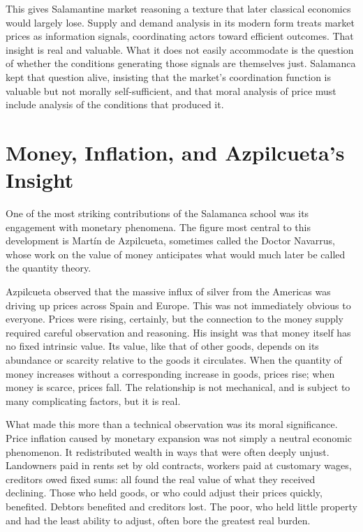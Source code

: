 \documentclass[11pt,a4paper,oneside]{book}
\begin{document}
This gives Salamantine market reasoning a texture that later classical economics would largely lose. Supply and demand analysis in its modern form treats market prices as information signals, coordinating actors toward efficient outcomes. That insight is real and valuable. What it does not easily accommodate is the question of whether the conditions generating those signals are themselves just. Salamanca kept that question alive, insisting that the market's coordination function is valuable but not morally self-sufficient, and that moral analysis of price must include analysis of the conditions that produced it.

\section*{Money, Inflation, and Azpilcueta's Insight}

One of the most striking contributions of the Salamanca school was its engagement with monetary phenomena. The figure most central to this development is Martín de Azpilcueta, sometimes called the Doctor Navarrus, whose work on the value of money anticipates what would much later be called the quantity theory.

Azpilcueta observed that the massive influx of silver from the Americas was driving up prices across Spain and Europe. This was not immediately obvious to everyone. Prices were rising, certainly, but the connection to the money supply required careful observation and reasoning. His insight was that money itself has no fixed intrinsic value. Its value, like that of other goods, depends on its abundance or scarcity relative to the goods it circulates. When the quantity of money increases without a corresponding increase in goods, prices rise; when money is scarce, prices fall. The relationship is not mechanical, and is subject to many complicating factors, but it is real.

What made this more than a technical observation was its moral significance. Price inflation caused by monetary expansion was not simply a neutral economic phenomenon. It redistributed wealth in ways that were often deeply unjust. Landowners paid in rents set by old contracts, workers paid at customary wages, creditors owed fixed sums: all found the real value of what they received declining. Those who held goods, or who could adjust their prices quickly, benefited. Debtors benefited and creditors lost. The poor, who held little property and had the least ability to adjust, often bore the greatest real burden.
\end{document}
